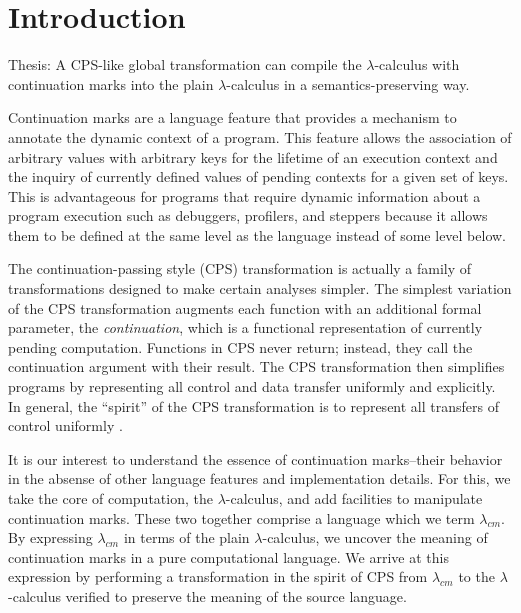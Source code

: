 \documentclass[ms,electronic,twosidetoc,letterpaper,chaptercenter,parttop]{byumsphd}
\title{\Title}
\author{\Author}
\begin{document}
\maketitle
{}

\section{Introduction}

Thesis: A CPS-like global transformation can compile the $\lambda$-calculus with
continuation marks into the plain $\lambda$-calculus in a semantics-preserving way.

Continuation marks \cite{clements2006portable} are a language feature that provides a
mechanism to annotate the dynamic context of a program. This feature allows the
association of arbitrary values with arbitrary keys for the lifetime of an execution
context and the inquiry of currently defined values of pending contexts for a given set of
keys. This is advantageous for programs that require dynamic information about a program
execution such as debuggers, profilers, and steppers because it allows them to be defined
at the same level as the language instead of some level below.

The continuation-passing style (CPS) transformation is actually a family of 
transformations designed to make certain analyses simpler. The simplest variation of the 
CPS transformation augments each function with an additional formal parameter, the 
\emph{continuation}, which is a functional representation of currently pending 
computation. Functions in CPS never return; instead, they call the continuation argument 
with their result. The CPS transformation then simplifies programs by representing all 
control and data transfer uniformly and explicitly. In general, the ``spirit'' of the 
CPS transformation is to represent all transfers of control uniformly \cite{sabry1994formal}.

It is our interest to understand the essence of continuation marks--their behavior in the 
absense of other language features and implementation details. For this, we take the core 
of computation, the $\lambda$-calculus, and add facilities to manipulate continuation 
marks. These two together comprise a language which we term $\lambda_{cm}$. By expressing 
$\lambda_{cm}$ in terms of the plain $\lambda$-calculus, we uncover the meaning of 
continuation marks in a pure computational language. We arrive at this expression by 
performing a transformation in the spirit of CPS from $\lambda_{cm}$ to the $\lambda$-calculus 
verified to preserve the meaning of the source language.
\end{document}
